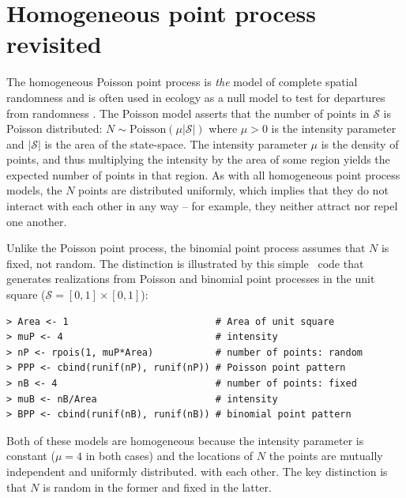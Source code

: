 \section{Homogeneous point process revisited}

The homogeneous Poisson point process is \textit{the} model of complete
spatial randomness and is often used in ecology as a null model
to test for departures from randomness
\citep{cressie:1992, diggle:2003, illian_etal:2008}.
The Poisson model asserts that the number of points in $\mathcal{S}$ is
Poisson distributed: $N \sim \text{Poisson}(\mu|\mathcal{S}|)$ where $\mu>0$ is
the intensity parameter and $|\mathcal{S}|$ is the area of the
state-space. The intensity parameter $\mu$
is the density of points, and thus multiplying the intensity by the area
of some region yields the expected number of points in that region.
As with all homogeneous point process models, the $N$ points are
distributed uniformly, which implies that they do not interact with each other in
any way -- for example, they neither attract nor repel one another.

Unlike the Poisson point process, the
binomial point process assumes that $N$ is fixed, not random.
The distinction is illustrated by this simple \R~code that generates
realizations from Poisson and binomial point processes in the unit
square ($\mathcal{S} = [0,1]\times[0,1]$):
\begin{small}
\begin{verbatim}
> Area <- 1                          # Area of unit square
> muP <- 4                           # intensity
> nP <- rpois(1, muP*Area)           # number of points: random
> PPP <- cbind(runif(nP), runif(nP)) # Poisson point pattern
> nB <- 4                            # number of points: fixed
> muB <- nB/Area                     # intensity
> BPP <- cbind(runif(nB), runif(nB)) # binomial point pattern
\end{verbatim}
\end{small}
Both of these models are homogeneous because the intensity parameter
is constant ($\mu=4$ in both cases) and the locations of $N$ the
points are mutually independent and uniformly distributed.
with each other. %
The key distinction
is that $N$ is random in the former and fixed in the latter.%

